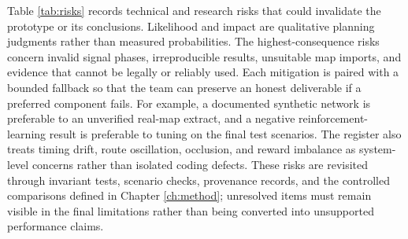 Table \ref{tab:risks} records technical and research risks that could invalidate the prototype or its conclusions. Likelihood and impact are qualitative planning judgments rather than measured probabilities. The highest-consequence risks concern invalid signal phases, irreproducible results, unsuitable map imports, and evidence that cannot be legally or reliably used. Each mitigation is paired with a bounded fallback so that the team can preserve an honest deliverable if a preferred component fails. For example, a documented synthetic network is preferable to an unverified real-map extract, and a negative reinforcement-learning result is preferable to tuning on the final test scenarios. The register also treats timing drift, route oscillation, occlusion, and reward imbalance as system-level concerns rather than isolated coding defects. These risks are revisited through invariant tests, scenario checks, provenance records, and the controlled comparisons defined in Chapter \ref{ch:method}; unresolved items must remain visible in the final limitations rather than being converted into unsupported performance claims.

